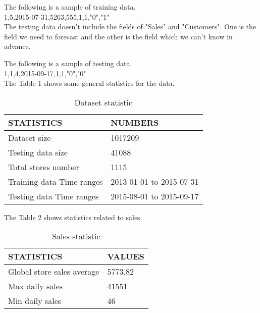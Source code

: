 \documentclass[jou,apacite]{apa6}
\begin{document}
The following is a sample of training data.\\

1,5,2015-07-31,5263,555,1,1,"0","1"\\

The testing data doesn't include the fields of "Sales" and "Customers". One is the field we need to forecast and the other is the field which we can't know in advance. 

The following is a sample of testing data.\\

1,1,4,2015-09-17,1,1,"0","0"\\

The Table 1 shows some general statistics for the data.

  \begin{table}
  \caption{Dataset statistic} 
  \begin{tabular}{|l|l|}
  \hline
  STATISTICS & NUMBERS \\
  \hline
  Dataset size & 1017209 \\
  \hline
  Testing data size & 41088 \\
  \hline
  Total stores number & 1115 \\
  \hline
  Training data Time ranges & 2013-01-01 to 2015-07-31 \\
  \hline
  Testing data Time ranges & 2015-08-01 to 2015-09-17 \\
  \hline  
  \end{tabular}
  \end{table}
  
The Table 2 shows statistics related to sales.
  
  \begin{table}
  \caption{Sales statistic} 
  \begin{tabular}{|l|l|}
  \hline
  STATISTICS & VALUES \\
  \hline
  Global store sales average & 5773.82 \\
  \hline
  Max daily sales & 41551 \\
  \hline
  Min daily sales & 46 \\
  \hline
  \end{tabular}
  \end{table}
\end{document}
